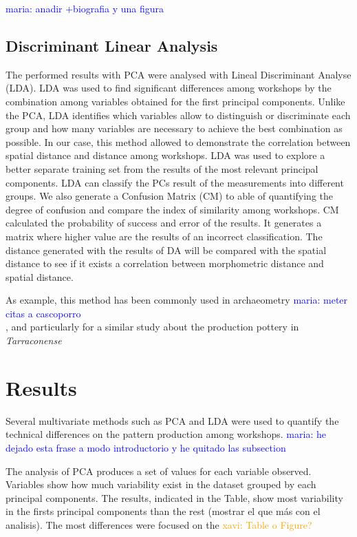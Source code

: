 \documentclass[review]{elsarticle}
\newcommand{\memo}[2]{\textcolor{#1}{#2}}
\newcommand{\xavi}[1]{\memo{orange}{xavi: #1\\}}
\newcommand{\maria}[1]{\memo{blue}{maria: #1\\}}
\begin{document}
\maria{anadir +biografia y una figura}


\subsection{Discriminant Linear Analysis} 


The performed results with PCA were analysed with Lineal Discriminant Analyse (LDA). LDA was used to find significant differences among workshops by the combination among variables obtained for the first principal components. Unlike the PCA, LDA identifies which variables allow to distinguish or discriminate each group and how many variables are necessary to achieve the best combination as possible. In our case, this method allowed to demonstrate the correlation between spatial distance and distance among workshops. LDA was used to explore a better separate training set from the results of the most relevant principal components. LDA can classify the PCs result of the measurements into different groups.  We also generate a Confusion Matrix (CM) to able of quantifying the degree of confusion and compare the index of similarity among workshops.  CM calculated the probability of success and error of the results. It generates a matrix where higher value are the results of an incorrect classification. The distance generated with the results of DA will be compared with the spatial distance to see if it exists a correlation between morphometric distance and spatial distance. 

As example, this method has been commonly used in archaeometry \citep{charlton_investigating_2012} \maria{meter citas a cascoporro}, and particularly for a similar study about the production pottery in \emph{Tarraconense} \citep{i_martin_alisis_1998}



\section{Results}

Several multivariate methods such as PCA and LDA were used to quantify the technical differences on the pattern production among workshops. 
\maria{he dejado esta frase a modo introductorio y he quitado las subsection} 

The analysis of PCA produces a set of values for each variable observed. Variables show how much variability exist in the dataset grouped by each principal components. The results, indicated in the Table, show most variability in the firsts principal components than the rest (mostrar el que más con el analisis).
The most differences were focused on the %
\xavi{Table o Figure?}    
\end{document}
